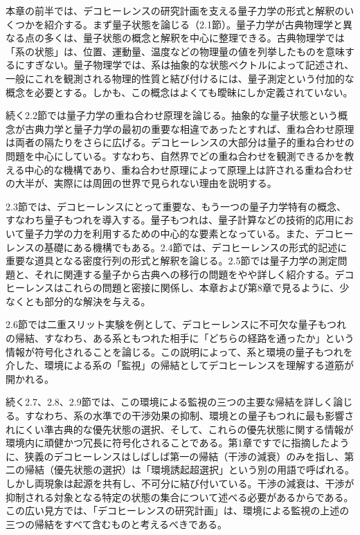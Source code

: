 \hypertarget{srcpage:13}{}\label{srcpage:13}
本章の前半では、デコヒーレンスの研究計画を支える量子力学の形式と解釈のいくつかを紹介する。まず量子状態を論じる（2.1節）。量子力学が古典物理学と異なる点の多くは、量子状態の概念と解釈を中心に整理できる。古典物理学では「系の状態」は、位置、運動量、温度などの物理量の値を列挙したものを意味するにすぎない。量子物理学では、系は抽象的な状態ベクトルによって記述され、一般にこれを観測される物理的性質と結び付けるには、量子測定という付加的な概念を必要とする。しかも、この概念はよくても曖昧にしか定義されていない。

続く2.2節では量子力学の重ね合わせ原理を論じる。抽象的な量子状態という概念が古典力学と量子力学の最初の重要な相違であったとすれば、重ね合わせ原理は両者の隔たりをさらに広げる。デコヒーレンスの大部分は量子的重ね合わせの問題を中心にしている。すなわち、自然界でどの重ね合わせを観測できるかを教える中心的な機構であり、重ね合わせ原理によって原理上は許される重ね合わせの大半が、実際には周囲の世界で見られない理由を説明する。

2.3節では、デコヒーレンスにとって重要な、もう一つの量子力学特有の概念、すなわち量子もつれを導入する。量子もつれは、量子計算などの技術的応用において量子力学の力を利用するための中心的な要素となっている。また、デコヒーレンスの基礎にある機構でもある。2.4節では、デコヒーレンスの形式的記述に重要な道具となる密度行列の形式と解釈を論じる。2.5節では量子力学の測定問題と、それに関連する量子から古典への移行の問題をやや詳しく紹介する。デコヒーレンスはこれらの問題と密接に関係し、本章および第8章で見るように、少なくとも部分的な解決を与える。

2.6節では二重スリット実験を例として、デコヒーレンスに不可欠な量子もつれの帰結、すなわち、ある系ともつれた相手に「どちらの経路を通ったか」という情報が符号化されることを論じる。この説明によって、系と環境の量子もつれを介した、環境による系の「監視」の帰結としてデコヒーレンスを理解する道筋が開かれる。

\hypertarget{srcpage:14}{}\label{srcpage:14}
続く2.7、2.8、2.9節では、この環境による監視の三つの主要な帰結を詳しく論じる。すなわち、系の水準での干渉効果の抑制、環境との量子もつれに最も影響されにくい準古典的な優先状態の選択、そして、これらの優先状態に関する情報が環境内に頑健かつ冗長に符号化されることである。第1章ですでに指摘したように、狭義のデコヒーレンスはしばしば第一の帰結（干渉の減衰）のみを指し、第二の帰結（優先状態の選択）は「環境誘起超選択」という別の用語で呼ばれる。しかし両現象は起源を共有し、不可分に結び付いている。干渉の減衰は、干渉が抑制される対象となる特定の状態の集合について述べる必要があるからである。この広い見方では、「デコヒーレンスの研究計画」は、環境による監視の上述の三つの帰結をすべて含むものと考えるべきである。

